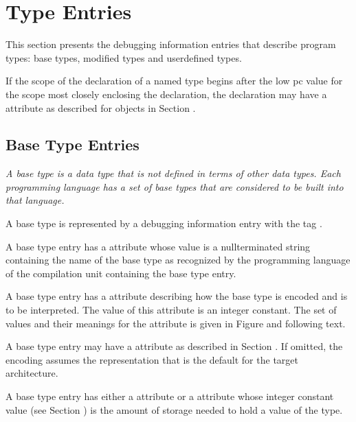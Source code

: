 \chapter{Type Entries}
\label{chap:typeentries}
This section presents the debugging information entries
that describe program types: base types, modified types and
user\dash defined types.

If the scope of the declaration of a named type begins after
the low pc value for the scope most closely enclosing the
declaration, the declaration may have a 
attribute as described for objects in 
Section .

\section{Base Type Entries}
\label{chap:basetypeentries}

\textit{A base type is a data type that is not defined in terms of
other data types. Each programming language has a set of base
types that are considered to be built into that language.}

A base type is represented by a debugging information entry
with the tag 
.

A base type entry has a  attribute whose value is
a null\dash terminated string containing the name of the base type
as recognized by the programming language of the compilation
unit containing the base type entry.

A base type entry has a  attribute describing
how the base type is encoded and is to be interpreted. The
value of this attribute is an integer constant. The set of
values and their meanings for the  attribute
is given in 
Figure 
and following text.  

A base type entry
may have a  attribute as described in 
Section . 
If omitted, the encoding assumes the representation that
is the default for the target architecture.

A base type entry has either a  attribute
or a  attribute whose integer constant value
(see Section ) 
is the amount of storage needed to hold
a value of the type.

